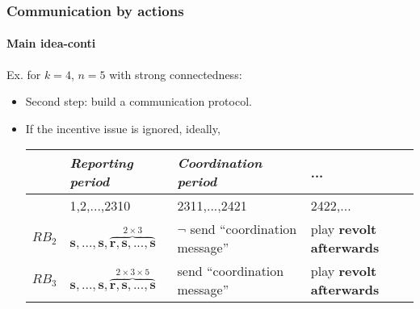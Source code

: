 \documentclass[9pt]{beamer}
\begin{document}
\begin{frame}
  \frametitle{Communication by actions}
\framesubtitle{Main idea-conti}

Ex. for $k=4$, $n=5$ with strong connectedness:
  \begin{center}
\end{center}

\begin{itemize}[<+->]
\item Second step: build a communication protocol.
\item If the incentive issue is ignored, ideally,
\begin{table}[h]
\begin{tabular}{l l l l}
& \textit{Reporting period} & \textit{Coordination period} & ...\\
\hline
& 1,2,...,2310 & 2311,...,2421 & 2422,...\\
\hline
$RB_2$ & $\textbf{s},...,\textbf{s},\overbrace{\textbf{r},\textbf{s},...,\textbf{s}}^{2\times 3}$ & $\neg$ send ``coordination message''  & play \textbf{revolt afterwards}\\
$RB_3$ & $\textbf{s},...,\textbf{s},\overbrace{\textbf{r},\textbf{s},...,\textbf{s}}^{2\times 3\times 5}$ &  send ``coordination message'' & play \textbf{revolt afterwards}
\end{tabular}
\end{table}
\end{itemize}

\end{frame}
\end{document}
